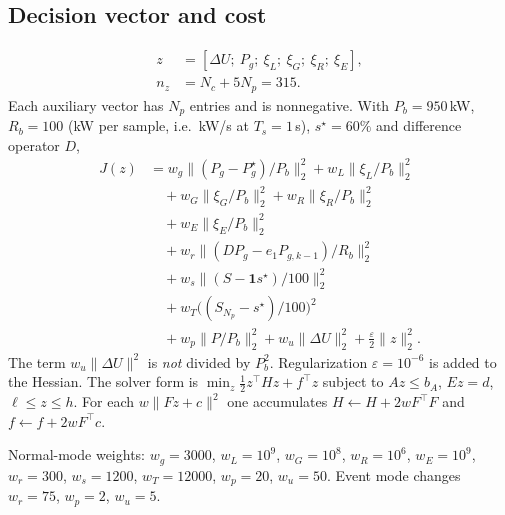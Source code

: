 \documentclass{ieeeaccess}
\begin{document}
\subsection{Decision vector and cost}
\begin{equation}
\begin{aligned}
z&=[\Delta U;\ P_g;\ \xi_L;\ \xi_G;\ \xi_R;\ \xi_E],\\
n_z&=N_c+5N_p=315.
\end{aligned}
\end{equation}
Each auxiliary vector has $N_p$ entries and is nonnegative. With $P_b=950$\,kW, $R_b=100$ (kW per sample, i.e.\ kW/s at $T_s=1$\,s), $s^\star=60\%$ and difference operator $D$,
\begin{equation}
\begin{aligned}
J(z)
&= w_g\big\|(P_g-P_g^\star)/P_b\big\|_2^2
 + w_L\big\|\xi_L/P_b\big\|_2^2 \\
&\quad + w_G\big\|\xi_G/P_b\big\|_2^2
 + w_R\big\|\xi_R/P_b\big\|_2^2 \\
&\quad + w_E\big\|\xi_E/P_b\big\|_2^2 \\
&\quad + w_r\big\|(D P_g-e_1 P_{g,k-1})/R_b\big\|_2^2 \\
&\quad + w_s\big\|(S-\mathbf{1}s^\star)/100\big\|_2^2 \\
&\quad + w_T\bigl((S_{N_p}-s^\star)/100\bigr)^2 \\
&\quad + w_p\big\|P/P_b\big\|_2^2
 + w_u\|\Delta U\|_2^2
 + \tfrac{\varepsilon}{2}\|z\|_2^2.
\end{aligned}
\end{equation}
The term $w_u\|\Delta U\|^2$ is \emph{not} divided by $P_b^2$. Regularization $\varepsilon=10^{-6}$ is added to the Hessian. The solver form is $\min_z \tfrac12 z^\top H z+f^\top z$ subject to $Az\le b_A$, $Ez=d$, $\ell\le z\le h$. For each $w\|Fz+c\|^2$ one accumulates $H\leftarrow H+2w F^\top F$ and $f\leftarrow f+2w F^\top c$.

Normal-mode weights: $w_g=3000$, $w_L=10^9$, $w_G=10^8$, $w_R=10^6$, $w_E=10^9$, $w_r=300$, $w_s=1200$, $w_T=12000$, $w_p=20$, $w_u=50$. Event mode changes $w_r=75$, $w_p=2$, $w_u=5$.
\end{document}
